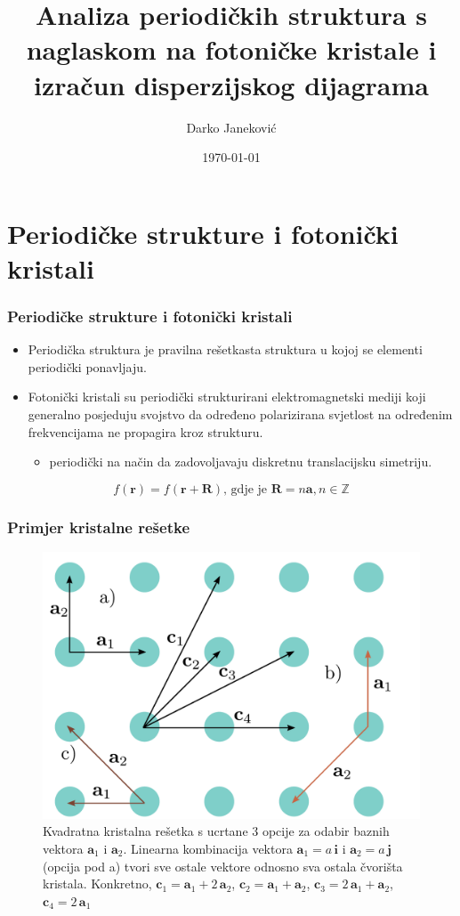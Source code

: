 \documentclass{beamer}
\title{Analiza periodičkih struktura s naglaskom na fotoničke kristale i izračun
disperzijskog dijagrama}
\author{Darko Janeković}
\institute{Fakultet elektrotehnike i računarstva, Zagreb}
\date{\today}
\begin{document}
\begin{frame}[t,plain]
\titlepage
\end{frame}

\section{Periodičke strukture i fotonički kristali}
\begin{frame}
    \frametitle{Periodičke strukture i fotonički kristali}
    \begin{itemize}
        \item Periodička struktura je pravilna rešetkasta struktura u kojoj se
            elementi periodički ponavljaju.
        \item Fotonički kristali su periodički strukturirani elektromagnetski
            mediji koji generalno posjeduju svojstvo da određeno polarizirana
            svjetlost na određenim frekvencijama ne propagira kroz strukturu.
        \begin{itemize}
            \item periodički na način da zadovoljavaju diskretnu translacijsku
                simetriju.
        \end{itemize}
    \end{itemize}

    \begin{equation}
        f(\mathbf{r}) = f(\mathbf{r} + \mathbf{R}) \text{, gdje je }{\mathbf{R} =
        n\mathbf{a}}, n \in \mathbb{Z}
    \end{equation}
\end{frame}

\begin{frame}
\frametitle{Primjer kristalne rešetke}
\begin{figure}[ht]
	\centering
	\includegraphics[width = 0.7\linewidth]{./images/pdf/crystal_lattice.pdf}
	\caption{Kvadratna kristalna rešetka s ucrtane 3 opcije za odabir baznih
	vektora $\mathbf{a}_1$ i $\mathbf{a}_2$. Linearna kombinacija vektora
	$\mathbf{a}_1 = a \, \mathbf{i}$ i $\mathbf{a}_2 = a \, \mathbf{j}$ (opcija
	pod a) tvori sve ostale vektore odnosno sva ostala čvorišta kristala.
	Konkretno,
	${\mathbf{c}_1 = \mathbf{a}_1 + 2 \, \mathbf{a}_2}$,
	${\mathbf{c}_2 = \mathbf{a}_1 + \mathbf{a}_2}$,
	${\mathbf{c}_3 = 2 \, \mathbf{a}_1 + \mathbf{a}_2}$,
	${\mathbf{c}_4 = 2 \, \mathbf{a}_1}$}
	\label{fig:crystal_lattice}
\end{figure}
\end{frame}
\end{document}
